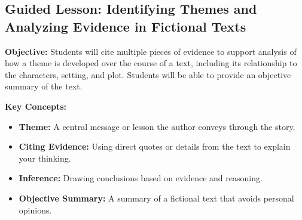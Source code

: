 \documentclass[12pt]{article}
\begin{document}
\subsection*{Guided Lesson: Identifying Themes and Analyzing Evidence in Fictional Texts}
\onehalfspacing

\begin{tcolorbox}[colframe=black!40, colback=gray!5, 
coltitle=black, colbacktitle=black!20, fonttitle=\bfseries\Large, 
title=Learning Objective, halign title=center]
\textbf{Objective:} Students will cite multiple pieces of evidence to support analysis of how a theme is developed over the course of a text, including its relationship to the characters, setting, and plot. Students will be able to provide an objective summary of the text.
\end{tcolorbox}

\vspace{1em}

\begin{tcolorbox}[colframe=black!60, colback=white, 
coltitle=black, colbacktitle=black!15, fonttitle=\bfseries\Large, 
title=Key Concepts and Vocabulary, halign title=center]
\textbf{Key Concepts:}
\begin{itemize}
    \item \textbf{Theme:} A central message or lesson the author conveys through the story.
    \item \textbf{Citing Evidence:} Using direct quotes or details from the text to explain your thinking.
    \item \textbf{Inference:} Drawing conclusions based on evidence and reasoning.
    \item \textbf{Objective Summary:} A summary of a fictional text that avoids personal opinions.
\end{itemize}
\end{tcolorbox}

\vspace{1em}
\end{document}
